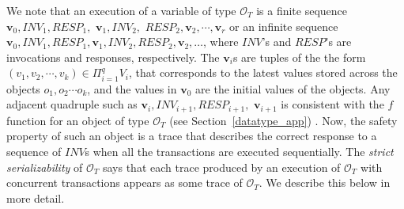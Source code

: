 \sloppy We note that an execution of a variable of type $\mathcal{O}_T$ is a finite sequence 
$\mathbf{v}_0, INV_1, RESP_1,$ $\mathbf{v}_1, INV_2,$ $ RESP_2, \mathbf{v}_2, \cdots, \mathbf{v}_r$ or an infinite sequence 
$\mathbf{v}_0, INV_1, RESP_1, \mathbf{v}_1, INV_2, RESP_2, \mathbf{v}_2, \ldots$, where $INV$'s and 
$RESP$'s are invocations and 
responses, respectively. The $\mathbf{v}_i$s are tuples  of the the form $(v_{1}, v_{2}, \cdots, v_{k}) \in \Pi_{i=1}^{q} V_{i}$, that 
corresponds to the latest values stored across the objects $o_1, o_2\cdots o_k$, and the values in  $\mathbf{v}_0$ are  the initial 
values of the objects. Any adjacent quadruple such as  $\mathbf{v}_i, INV_{i+1}, RESP_{i+1},$ $\mathbf{v}_{i+1}$  is consistent with the $f$ 
function for an object of type $\mathcal{O}_T$ (see  Section~\ref{datatype_app}) . Now, the safety property of such an 
object is a trace that describes the 
correct response to a sequence of $INV$s when all the transactions are executed sequentially. The \emph{strict serializability} of 
$\mathcal{O}_T$ says that each trace produced by an execution of $\mathcal{O}_T$ with concurrent transactions appears as some trace of $\mathcal{O}_T$. We describe this below in more detail. 

